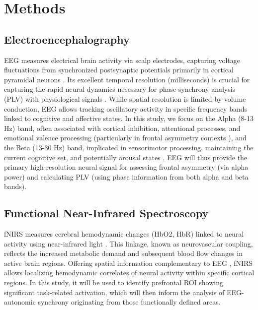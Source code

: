 \documentclass[12pt]{article} %
\begin{document}
\newpage
\section{Methods}

\subsection{Electroencephalography} %
\gls{EEG} measures electrical brain activity via scalp electrodes, capturing voltage fluctuations from synchronized postsynaptic potentials primarily in cortical pyramidal neurons \parencite{sharmaEmergingTrendsEEG2024, chaddadElectroencephalographySignalProcessing2023}. Its excellent temporal resolution (milliseconds) is crucial for capturing the rapid neural dynamics necessary for phase synchrony analysis (\gls{PLV}) with physiological signals \parencite{cohenAnalyzingNeuralTime2014}. While spatial resolution is limited by volume conduction, \gls{EEG} allows tracking oscillatory activity in specific frequency bands linked to cognitive and affective states. In this study, we focus on the Alpha (8-13 Hz) band, often associated with cortical inhibition, attentional processes, and emotional valence processing (particularly in frontal asymmetry contexts \parencite{allenIssuesAssumptionsRoad2004, allenIssuesAssumptionsRoad2004}), and the Beta (13-30 Hz) band, implicated in sensorimotor processing, maintaining the current cognitive set, and potentially arousal states \parencite{klimeschEEGAlphaTheta1999, engelDynamicPredictionsOscillations2001}. \gls{EEG} will thus provide the primary high-resolution neural signal for assessing frontal asymmetry (via alpha power) and calculating \gls{PLV} (using phase information from both alpha and beta bands).

\subsection{Functional Near-Infrared Spectroscopy} %
\gls{fNIRS} measures cerebral hemodynamic changes (\gls{HbO2}, \gls{HbR}) linked to neural activity using near-infrared light \parencite{scholkmannReviewContinuousWave2014, jobsisNoninvasiveInfraredMonitoring1977, obrigVisibleImagingHuman2003}. This linkage, known as neurovascular coupling, reflects the increased metabolic demand and subsequent blood flow changes in active brain regions. Offering spatial information complementary to \gls{EEG} \parencite{pintiCurrentStatusIssues2019}, \gls{fNIRS} allows localizing hemodynamic correlates of neural activity within specific cortical regions. In this study, it will be used to identify prefrontal \gls{ROI} showing significant task-related activation, which will then inform the analysis of \gls{EEG}-autonomic synchrony originating from those functionally defined areas.
\end{document}
